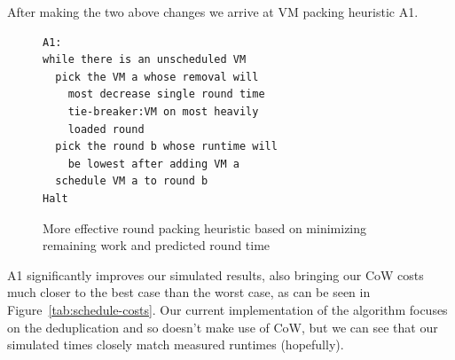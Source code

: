 After making the two above changes we arrive at VM packing heuristic A1.

\begin{figure}
\begin{lstlisting}[frame=single]
A1:
while there is an unscheduled VM
  pick the VM a whose removal will
    most decrease single round time
    tie-breaker:VM on most heavily
    loaded round
  pick the round b whose runtime will
    be lowest after adding VM a
  schedule VM a to round b
Halt
\end{lstlisting}
\caption{More effective round packing heuristic based on minimizing remaining work and predicted round time}
\end{figure}

A1 significantly improves our simulated results, also bringing our CoW costs
much closer to the best case than the worst case, as can be seen in
Figure~\ref{tab:schedule-costs}.  Our current implementation of the algorithm
focuses on the deduplication and so doesn't make use of CoW, but we can see
that our simulated times closely match measured runtimes (hopefully). 
